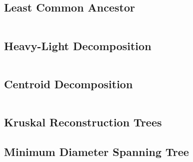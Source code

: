 \subsection{Least Common Ancestor}

\hrulefill \vspace{-\baselineskip}
\begin{multicols}{2}
\inputminted[autogobble,fontsize=\footnotesize]{C++}{Trees/lca.cpp}
\end{multicols}
\vspace{-\baselineskip}
\noindent \hrulefill

\newpage

\subsection{Heavy-Light Decomposition}

\hrulefill \vspace{-\baselineskip}
\begin{multicols}{2}
\inputminted[autogobble,fontsize=\footnotesize]{C++}{Trees/hld.cpp}
\end{multicols}
\vspace{-\baselineskip}
\noindent \hrulefill

\subsection{Centroid Decomposition}

\hrulefill \vspace{-\baselineskip}
\begin{multicols}{2}
\inputminted[autogobble,fontsize=\footnotesize]{C++}{Trees/centroid.cpp}
\end{multicols}
\vspace{-\baselineskip}
\noindent \hrulefill

\subsection{Kruskal Reconstruction Trees}
\subsection{Minimum Diameter Spanning Tree}

\hrulefill \vspace{-\baselineskip}
\begin{multicols}{2}
\inputminted[autogobble,fontsize=\tiny]{C++}{Trees/mdst.cpp}
\end{multicols}
\vspace{-\baselineskip}
\noindent \hrulefill

